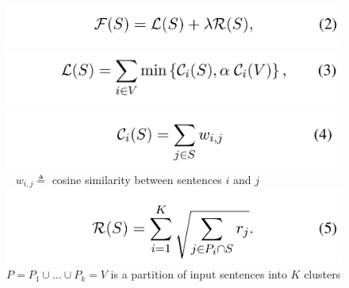 \documentclass[xcolor={table}]{beamer}
\begin{document}
\begin{frame}[t]{\cite{lin2011class}}
      \begin{figure}[h]
      \includegraphics[scale=.2]{images/math2-lin11.png} \\
      \includegraphics[scale=.2]{images/math3-lin11.png} \\
      \includegraphics[scale=.2]{images/math4-lin11.png} \\
      $\;\;\; w_{i,j} \triangleq $ cosine similarity between sentences $i$ and 
      $j$\\
      \includegraphics[scale=.2]{images/math5-lin11.png} \\
      $P = P_1 \cup \ldots \cup P_k = V$ is a partition of input sentences
        into $K$ clusters\\
  \end{figure}
\end{frame}
\end{document}
